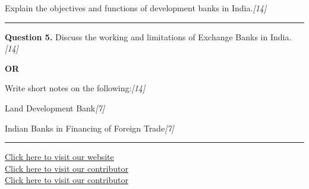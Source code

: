 \documentclass[11pt,a4paper]{article}
\newcommand{\pts}[1]{\hfill   \textit{[#1]}}
\begin{document}
Explain the objectives and functions of development banks in India.\pts{14}

\medskip\rule{\linewidth}{0.2pt}




\noindent   \textbf{Question 5.}
Discuss the working and limitations of Exchange Banks in India.\pts{14}

\centerline{   \textbf{OR}}

Write short notes on the following:\pts{14}

\begin{parts}
  \item Land Development Bank\pts{7}
  \item Indian Banks in Financing of Foreign Trade\pts{7}
\end{parts}

\vfill
\rule{\linewidth}{0.4pt}

\begin{center}\small
\href{https://bhu-exam.vercel.app/}{Click here to visit our website}\\[4pt]
\href{https://me-aryan.vercel.app/}{Click here to visit our contributor}\\[4pt]
\href{https://quashan-me.vercel.app/}{Click here to visit our contributor}
\end{center}
\end{document}

